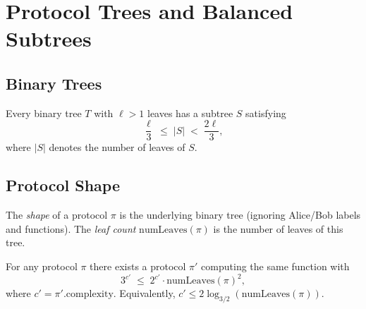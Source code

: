 \chapter{Protocol Trees and Balanced Subtrees}

\section{Binary Trees}

\begin{lemma}
  \label{lem:balanced_subtree}
  \leanok
  Every binary tree $T$ with $\ell > 1$ leaves has a subtree $S$ satisfying
  \[
    \frac{\ell}{3} \;\le\; |S| \;<\; \frac{2\ell}{3},
  \]
  where $|S|$ denotes the number of leaves of $S$.
\end{lemma}

\section{Protocol Shape}

\begin{definition}
  \label{def:protocol_shape}
  \leanok
  The \emph{shape} of a protocol $\pi$ is the underlying binary tree (ignoring
  Alice/Bob labels and functions).  The \emph{leaf count} $\mathrm{numLeaves}(\pi)$
  is the number of leaves of this tree.
\end{definition}

\begin{theorem}
  \label{thm:complexity_log_leaves}
  For any protocol $\pi$ there exists a protocol $\pi'$ computing the same
  function with
  \[
    3^{c'} \;\le\; 2^{c'} \cdot \mathrm{numLeaves}(\pi)^2,
  \]
  where $c' = \pi'.\mathrm{complexity}$.
  Equivalently, $c' \le 2\log_{3/2}(\mathrm{numLeaves}(\pi))$.
\end{theorem}
